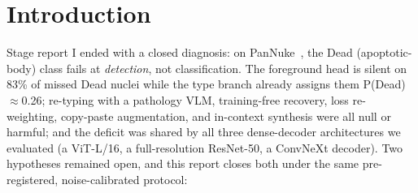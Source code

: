 \documentclass[11pt]{article}
\begin{document}
\begin{abstract}
split$\times$seed grid. The pre-registered seed-noise verdict on that grid: the
\emph{prices} are seed-robust ($4.7$--$5.3\times$ the largest seed std, same sign on every
run), the \emph{Dead gain} is fragile ($0.4$--$0.7\times$ the per-seed Dead std; one split's
seed-mean flips sign). Final standing: $-$0.008 mPQ / $-$0.005 bPQ buys $-$0.069
interior-Dead miss, $+$0.034 Dead $F_c$, and mPQ$^+$ parity---not a default win, an
explicitly priced trade. We conclude that the Dead deficit is not an artifact of one
architecture family: more pixels buy real detection gains, while separating---and
typing---what those pixels newly resolve remains unsolved, and pixel-unit decode constants
are a first-class confound that any resolution study must control for.
\end{abstract}

\section{Introduction}
\label{sec:intro}

Stage report I ended with a closed diagnosis: on PanNuke~\cite{gamper2019pannuke}, the Dead
(apoptotic-body) class fails at \emph{detection}, not classification. The foreground head is
silent on 83\% of missed Dead nuclei while the type branch already assigns them
P(Dead)$\approx$0.26; re-typing with a pathology VLM, training-free recovery, loss
re-weighting, copy-paste augmentation, and in-context synthesis were all null or harmful; and
the deficit was shared by all three dense-decoder architectures we evaluated (a ViT-L/16, a
full-resolution ResNet-50, a ConvNeXt decoder). Two hypotheses remained open, and this report
closes both under the same pre-registered, noise-calibrated protocol:
\end{document}
